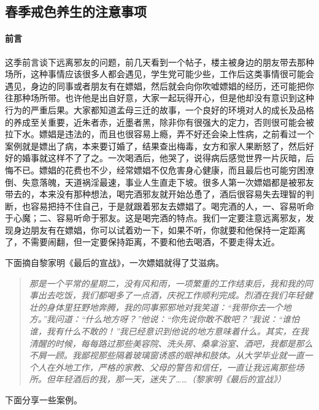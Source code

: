 \subsection{春季戒色养生的注意事项}

\paragraph*{前言}

这季前言谈下远离邪友的问题，前几天看到一个帖子，楼主被身边的朋友带去那种场所，这种事情应该很多人都会遇见，学生党可能少些，工作后这类事情很可能会遇见，身边的同事或者朋友有在嫖娼，然后就会向你吹嘘嫖娼的经历，还可能把你往那种场所带。也许他是出自好意，大家一起玩得开心，但是他却没有意识到这种行为的严重后果。大家都知道孟母三迁的故事，一个良好的环境对人的成长及品格的养成至关重要，近朱者赤，近墨者黑，除非你有很强大的定力，否则很可能会被拉下水。嫖娼是违法的，而且也很容易上瘾，弄不好还会染上性病，之前看过一个案例就是嫖出了病，本来要订婚了，结果查出梅毒，女方和家人果断怒了，然后好好的婚事就这样不了了之。一次喝酒后，他哭了，说得病后感觉世界一片灰暗，后悔不已。嫖娼的花费也不少，经常嫖娼不仅危害身心健康，而且最后也可能穷困潦倒、失意落魄，天道祸淫最速，事业人生直走下坡。很多人第一次嫖娼都是被邪友带去的，本来没有那种想法，喝完酒邪友就开始怂恿了，酒后很容易失去理智的判断，也容易把持不住自己，于是就跟着邪友去嫖娼了。喝完酒的人，一、容易听命于心魔；二、容易听命于邪友。这是喝完酒的特点。我们一定要注意远离邪友，发现身边朋友有在嫖娼，你可以试着劝一下，如果不听，你就要和他保持一定距离了，不需要闹翻，但一定要保持距离，不要和他去喝酒，不要走得太近。

下面摘自黎家明《最后的宣战》，一次嫖娼就得了艾滋病。

\begin{quote}\it
    那是一个平常的星期二，没有风和雨，一项繁重的工作结束后，我和我的同事出去吃饭，我们都喝多了一点酒，庆祝工作顺利完成。烈酒在我们年轻健壮的身体里狂野地奔腾，我的同事邪邪地对我笑道：“我带你去一个地方。”我问道：“什么地方呀？”他说：“你先说你敢不敢吧？”我说：“谁怕谁，我有什么不敢的！”我已经意识到他说的地方意味着什么。其实，在我清醒的时候，每每路过那些美容院、洗头房、桑拿浴室、酒吧，我都是那么不屑一顾。我鄙视那些隔着玻璃窗诱惑的眼神和肢体。从大学毕业就一直一个人在外地工作，严格的家教、父母的警告和信任，一直让我远离那些场所。但年轻酒后的我，那一天，迷失了……（黎家明《最后的宣战》）
\end{quote}

下面分享一些案例。


